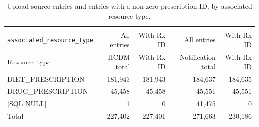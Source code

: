 \begin{longtable}{@{}lrrrr@{}}
\caption{Upload-source entries and entries with a non-zero prescription ID, by associated resource type.}
\label{tab:upload-source-resource-types}\\
\toprule
 &  &  \\
\cmidrule(lr){2-3}\cmidrule(lr){4-5}
\texttt{associated\_resource\_type} & All entries & With Rx ID & All entries & With Rx ID \\
\midrule
\endfirsthead
\toprule Resource type & HCDM total & With Rx ID & Notification total & With Rx ID \\
\midrule
\endhead

{DIET\_PRESCRIPTION} & 181,943 & 181,943 & 184,637 & 184,635 \\

{DRUG\_PRESCRIPTION} & 45,458 & 45,458 & 45,551 & 45,551 \\

{[SQL NULL]} & 1 & 0 & 41,475 & 0 \\
\midrule
{Total} & 227,402 & 227,401 & 271,663 & 230,186 \\
\bottomrule
\end{longtable}